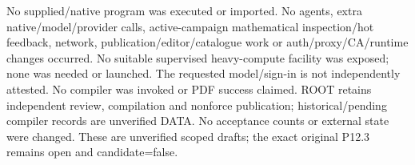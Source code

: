 No supplied/native program was executed or imported. No agents, extra
native/model/provider calls, active-campaign mathematical inspection/hot
feedback, network, publication/editor/catalogue work or auth/proxy/CA/runtime
changes occurred. No suitable supervised heavy-compute facility was exposed;
none was needed or launched. The requested model/sign-in is not independently
attested. No compiler was invoked or PDF success claimed. ROOT retains
independent review, compilation and nonforce publication; historical/pending
compiler records are unverified DATA. No acceptance counts or external
state were changed. These are unverified scoped drafts; the exact original
P12.3 remains open and candidate=false.

